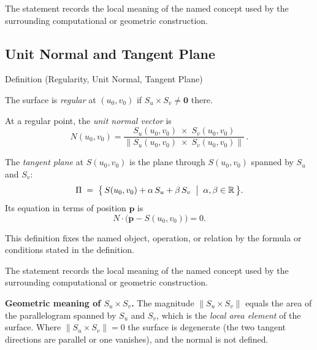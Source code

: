 \begin{remark*}[Interpretation]
The statement records the local meaning of the named concept used by the
surrounding computational or geometric construction.
\end{remark*}

\DefinitionalRoot

\subsection*{Unit Normal and Tangent Plane}

\begin{definitionbox}{Definition (Regularity, Unit Normal, Tangent Plane)}
\begin{definition}
\label{def:regularity-unit-normal-tangent-plane}
The surface is \emph{regular} at $(u_0,v_0)$ if
$S_u \times S_v \neq \mathbf{0}$ there.

At a regular point, the \emph{unit normal vector} is
\[
  N(u_0,v_0)
  = \frac{S_u(u_0,v_0)\;\times\; S_v(u_0,v_0)}
         {\|S_u(u_0,v_0)\;\times\; S_v(u_0,v_0)\|}\,.
\]

The \emph{tangent plane} at $S(u_0,v_0)$ is the plane through
$S(u_0,v_0)$ spanned by $S_u$ and $S_v$:
\[
  \Pi\;=\;\bigl\{\,S(u_0,v_0) + \alpha\,S_u + \beta\,S_v
               \;\bigm|\; \alpha,\beta\in\mathbb{R}\,\bigr\}.
\]
Its equation in terms of position $\mathbf{p}$ is
\[
  N\cdot\bigl(\mathbf{p} - S(u_0,v_0)\bigr) = 0.
\]
\end{definition}
\end{definitionbox}
\begin{remark*}
This definition fixes the named object, operation, or relation by the formula
or conditions stated in the definition.
\end{remark*}

\begin{remark*}[Interpretation]
The statement records the local meaning of the named concept used by the
surrounding computational or geometric construction.
\end{remark*}

\DefinitionalRoot

\begin{remark*}[Exposition]
\textbf{Geometric meaning of $S_u \times S_v$.}
The magnitude $\|S_u \times S_v\|$ equals the area of the
parallelogram spanned by $S_u$ and $S_v$, which is the
\emph{local area element} of the surface.
Where $\|S_u \times S_v\| = 0$ the surface is degenerate
(the two tangent directions are parallel or one vanishes),
and the normal is not defined.
\end{remark*}

